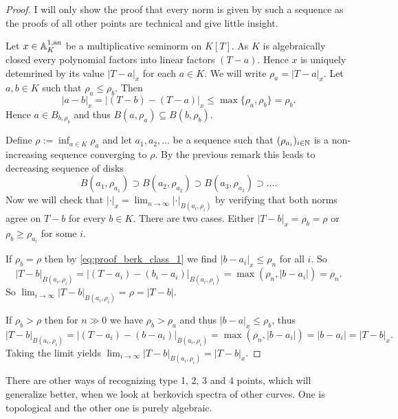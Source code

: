 \begin{proof}
	I will only show the proof that every norm is given by such a sequence as the proofs of all other points are technical and give little insight. 

	Let $x \in \mathbb{A}_K^{1, \text{an}}$ be a multiplicative seminorm on $K[T]$. 
	As  $K$ is algebraically closed every polynomial factors into linear factors $(T-a)$. 
	Hence $x$ is uniquely detemrined by its value $|T-a|_x$ for each $a \in K$. 
	We will write $\rho_a = |T-a|_x$.
	Let  $a, b \in K$ such that $\rho_a \le \rho_b$. 
	Then  \begin{equation}\label{eq:proof_berk_class_1}
		|a - b|_x = |(T-b) - (T - a)|_x \le \max \{\rho_a, \rho_b\} = \rho_b 
	.\end{equation} 
	Hence $a \in B_{b, \rho_b}$ and thus  $B(a, \rho_a) \subseteq B(b, \rho_b)$. 

	Define $\rho := \inf_{a \in K} \rho_a$ and let $a_1, a_2, \ldots$ be a sequence such that $(\rho_{a_i})_{i \in \mathbb{N}}  $ is a non-increasing sequence converging to $\rho$. 
	By the previous remark this leads to decreasing sequence of disks \[
		B(a_1, \rho_{a_1}) \supset B(a_2, \rho_{a_2}) \supset B(a_3, \rho_{a_3}) \supset\ldots
	.\] 
	Now we will check that $|\cdot |_x = \lim_{n \to \infty} |\cdot |_{B(a_i, \rho_i)}$ by verifying that both norms agree on $T- b$ for every $b \in K$. 
	 There are two cases. Either $|T - b|_x = \rho_b = \rho$ or $\rho_b \ge \rho_{a_i}$ for some $i$. 

	 If $ \rho_b = \rho$ then by \eqref{eq:proof_berk_class_1} we find $|b - a_i|_x \le \rho_n$ for all $i$.
	 So \[
		 |T - b|_{B(a_i, \rho_i)} = |(T - a_i) - (b_i - a_i)|_{B(a_i, \rho_i)} = \max(\rho_n, |b - a_i|) = \rho_n
	 .\]
	 So $\lim_{i \to \infty} |T- b|_{B(a_i, \rho_i)} = \rho = |T - b|$. 

	 If $\rho_b > \rho$ then for $n \gg 0$ we have $\rho_b > \rho_a$ and thus $|b - a|_x \le \rho_b$, thus \[
		 |T - b|_{B(a_i, \rho_i)} = |(T - a_i) - (b -a_i)|_{B(a_i, \rho_i)} = \max (\rho_n, |b - a_i|) = |b - a_i| = |T - b|_x
	 .\]   
	 Taking the limit yields $\lim_{i \to \infty} |T- b| _{B(a_i, \rho_{i})} = |T - b|_x$.
\end{proof}

There are other ways of recognizing type 1, 2, 3 and 4 points, which will generalize better, when we look at berkovich spectra of other curves. One is topological and the other one is purely algebraic. 

